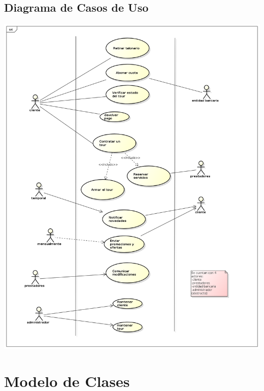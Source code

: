 \documentclass[12pt,a4paper]{article}
\begin{document}
\subsection{Diagrama de Casos de Uso}
	\includegraphics[scale=0.5]{images/UseCaseDiagram0.png}

\section{Modelo de Clases}
\end{document}
